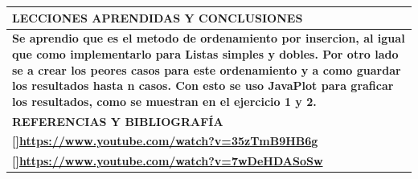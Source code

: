 \documentclass[9pt]{article}
\begin{document}
	\begin{table}[H]
		\begin{tabular}{|p{15cm}|}
			\hline 
			\rowcolor{tablebackground}
			\color{white}\textbf{LECCIONES APRENDIDAS Y CONCLUSIONES}  \\
			\hline 
			\textbf{Se aprendio que es el metodo de ordenamiento por insercion, 
			al igual que como implementarlo para Listas simples y dobles. Por otro lado se
			a crear los peores casos para este ordenamiento y a como guardar los resultados
			hasta n casos. Con esto se uso JavaPlot para graficar los resultados,
			como se muestran en el ejercicio 1 y 2.}  \\
			\hline 
			\rowcolor{tablebackground}
			\color{white}\textbf{REFERENCIAS Y BIBLIOGRAFÍA}  \\
			\hline 
			\textbf{[]\url{https://www.youtube.com/watch?v=35zTmB9HB6g}}\\
			\textbf{[]\url{https://www.youtube.com/watch?v=7wDeHDASoSw}}\\
			\hline 
		\end{tabular}
	\end{table}
\end{document}
